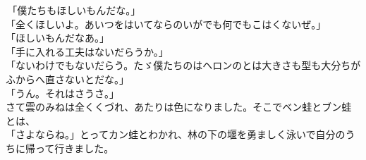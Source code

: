 \documentclass[
a4paper,
10pt,
book]
{tarticle}
\begin{document}
\newpage
\setcounter{page}{3}
\thispagestyle{fancy}
\begin{linenumbers}
    \noindent \,「僕たちもほしいもんだな。」\\
    「全くほしいよ。あいつをはいてならのいがでも何でもこはくないぜ。」\\
    「ほしいもんだなあ。」\\
    「手に入れる工夫はないだらうか。」\\
    「ないわけでもないだらう。たゞ僕たちのはヘロンのとは大きさも型も大分ちがふからへ直さないとだな。」\\
    「うん。それはさうさ。」\\
    \indent さて雲のみねは全くくづれ、あたりは色になりました。そこでベン蛙とブン蛙とは、\\
    「さよならね。」とってカン蛙とわかれ、林の下の堰を勇ましく泳いで自分のうちに帰って行きました。
\end{linenumbers}
\end{document}
